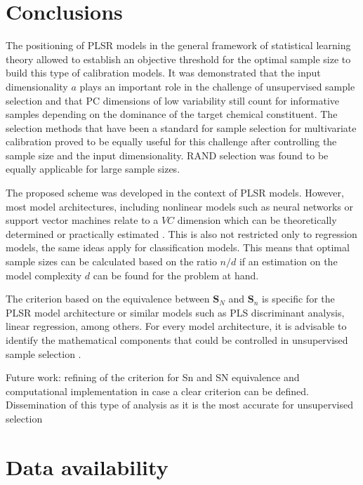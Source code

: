 \documentclass[journal=ancham,manuscript=article]{achemso}
\begin{document}
\section*{Conclusions}\label{conclusions}

The positioning of PLSR models in the general framework of statistical learning theory allowed to establish an objective threshold for the optimal sample size to build this type of calibration models. It was demonstrated that the input dimensionality $a$ plays an important role in the challenge of unsupervised sample selection and that PC dimensions of low variability still count for informative samples depending on the dominance of the target chemical constituent. The selection methods that have been a standard for sample selection for multivariate calibration proved to be equally useful for this challenge after controlling the sample size and the input dimensionality. RAND selection was found to be equally applicable for large sample sizes. 

The proposed scheme was developed in the context of PLSR models. However, most model architectures, including nonlinear models such as neural networks or support vector machines relate to a $VC$ dimension which can be theoretically determined or practically estimated \cite{Vapnik2019, Vapnik1994}. This is also not restricted only to regression models, the same ideas apply for classification models. This means that optimal sample sizes can be calculated based on the ratio $n/d$ if an estimation on the model complexity $d$ can be found for the problem at hand. 

The criterion based on the equivalence between $\mathbf{S}_N$ and $\mathbf{S}_n$ is specific for the PLSR model architecture or similar models such as PLS discriminant analysis, linear regression, among others. For every model architecture, it is advisable to identify the mathematical components that could be controlled in unsupervised sample selection \cite{Li2020}. 


Future work: refining of the criterion for Sn and SN equivalence and computational implementation in case a clear criterion can be defined. Dissemination of this type of analysis as it is the most accurate for unsupervised selection


\section{Data availability}
\end{document}
